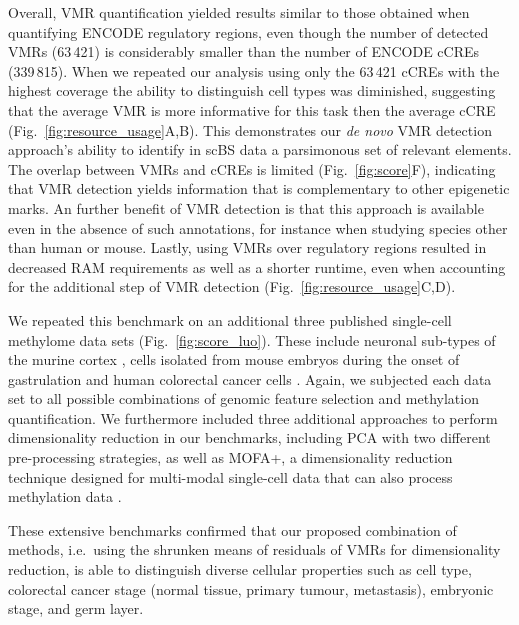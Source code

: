 \documentclass[twocolumn,10pt]{article}
\newcommand{\new}[1]{#1} %
\begin{document}
\new{
Overall, VMR quantification yielded results similar to those obtained when quantifying ENCODE regulatory regions, even though the number of detected VMRs (63\,421) is considerably smaller than the number of ENCODE cCREs (339\,815).
When we repeated our analysis using only the 63\,421 cCREs with the highest coverage the ability to distinguish cell types was diminished, suggesting that the average VMR is more informative for this task then the average cCRE (Fig.~\ref{fig:resource_usage}A,B).
This demonstrates our \textit{de novo} VMR detection approach's ability to identify in scBS data a parsimonous set of relevant elements. The overlap between VMRs and cCREs is limited (Fig.~\ref{fig:score}F), indicating that VMR detection yields information that is complementary to other epigenetic marks.
An further benefit of VMR detection is that this approach is available even in the absence of such annotations, for instance when studying species other than human or mouse.
Lastly, using VMRs over regulatory regions resulted in decreased RAM requirements as well as a shorter runtime, even when accounting for the additional step of VMR detection (Fig.~\ref{fig:resource_usage}C,D).
}

\new{
We repeated this benchmark on an additional three published single-cell methylome data sets (Fig.~\ref{fig:score_luo}).
These include neuronal sub-types of the murine cortex \citep[][using cell type labels derived from CH-methylation in genomic tiles instead of CpG-methylation as ground truth]{luo2017single}, cells isolated from mouse embryos during the onset of gastrulation \citep[][using RNA-derived cell clusters or alternatively embryonic stage as ground truth]{argelaguet2019gastru} and human colorectal cancer cells \citep[][using sampling region as ground truth]{bian2018single}.
Again, we subjected each data set to all possible combinations of genomic feature selection and methylation quantification.
We furthermore included three additional approaches to perform dimensionality reduction in our benchmarks, including PCA with two different pre-processing strategies, as well as MOFA+, a dimensionality reduction technique designed for multi-modal single-cell data that can also process methylation data \citep{argelaguet2020mofa}.
}

\new{
These extensive benchmarks confirmed that our proposed combination of methods, i.e.\ using the shrunken means of residuals of VMRs for dimensionality reduction, is able to distinguish diverse cellular properties such as cell type, colorectal cancer stage (normal tissue, primary tumour, metastasis), embryonic stage, and germ layer.
}
\end{document}
